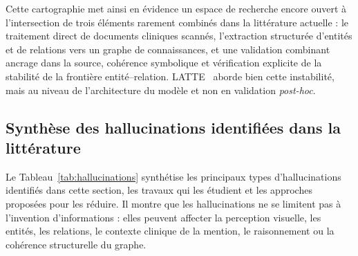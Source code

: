 Cette cartographie met ainsi en évidence un espace de recherche encore ouvert à l'intersection de trois éléments rarement combinés dans la littérature actuelle : le traitement direct de documents cliniques scannés, l'extraction structurée d'entités et de relations vers un graphe de connaissances, et une validation combinant ancrage dans la source, cohérence symbolique et vérification explicite de la stabilité de la frontière entité--relation. LATTE~\cite{zhang2026latte} aborde bien cette instabilité, mais au niveau de l'architecture du modèle et non en validation \textit{post-hoc}.


\subsection{Synthèse des hallucinations identifiées dans la littérature}

Le Tableau~\ref{tab:hallucinations} synthétise les principaux types d'hallucinations identifiés dans cette section, les travaux qui les étudient et les approches proposées pour les réduire. Il montre que les hallucinations ne se limitent pas à l'invention d'informations : elles peuvent affecter la perception visuelle, les entités, les relations, le contexte clinique de la mention, le raisonnement ou la cohérence structurelle du graphe.


